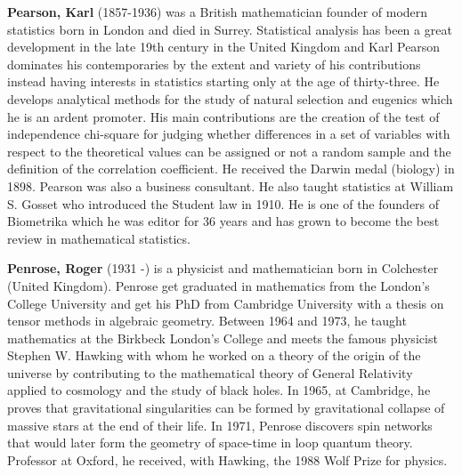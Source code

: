 \textbf{Pearson, Karl} (1857-1936) was a British mathematician founder of modern statistics born in London and died in Surrey. Statistical analysis has been a great development in the late 19th century in the United Kingdom and Karl Pearson dominates his contemporaries by the extent and variety of his contributions instead having interests in statistics starting only at the age of thirty-three. He develops analytical methods for the study of natural selection and eugenics which he is an ardent promoter. His main contributions are the creation of the test of independence chi-square for judging whether differences in a set of variables with respect to the theoretical values can be assigned or not a random sample and the definition of the correlation coefficient. He received the Darwin medal (biology) in 1898. Pearson was also a business consultant. He also taught statistics at William S. Gosset who introduced the Student law in 1910. He is one of the founders of Biometrika which he was editor for 36 years and has grown to become the best review in mathematical statistics.

\textbf{Penrose, Roger} (1931 -) is a physicist and mathematician born in Colchester (United Kingdom). Penrose get graduated in mathematics from the London's College University and get his PhD from Cambridge University with a thesis on tensor methods in algebraic geometry. Between 1964 and 1973, he taught mathematics at the Birkbeck London's College and meets the famous physicist Stephen W. Hawking with whom he worked on a theory of the origin of the universe by contributing to the mathematical theory of General Relativity applied to cosmology and the study of black holes. In 1965, at Cambridge, he proves that gravitational singularities can be formed by gravitational collapse of massive stars at the end of their life. In 1971, Penrose discovers spin networks that would later form the geometry of space-time in loop quantum theory. Professor at Oxford, he received, with Hawking, the 1988 Wolf Prize for physics.

